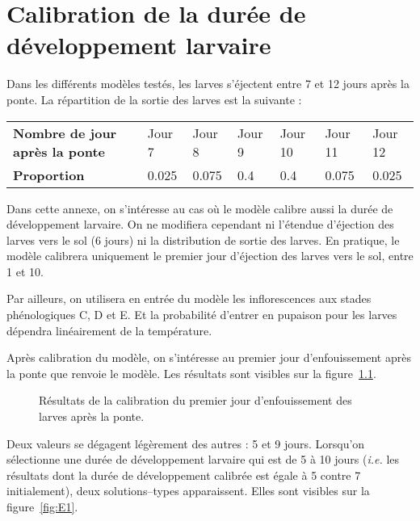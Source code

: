\chapter{Calibration de la durée de développement larvaire} 

Dans les différents modèles testés, les larves s’éjectent entre 7 et 12 jours après la ponte.
La répartition de la sortie des larves est la suivante :
\begin{center}
\small
\begin{tabular}{lllllll}
\textbf{Nombre de jour après la ponte} & Jour 7 & Jour 8 & Jour 9 & Jour 10 & Jour 11 & Jour 12\\
\textbf{Proportion} & 0.025 & 0.075 & 0.4 & 0.4 & 0.075 & 0.025
\end{tabular}
\end{center}

Dans cette annexe, on s'intéresse au cas où le modèle calibre aussi la durée de développement larvaire.
On ne modifiera cependant ni l'étendue d'éjection des larves vers le sol (6 jours) ni la distribution de sortie des larves.
En pratique, le modèle calibrera uniquement le premier jour d'éjection des larves vers le sol, entre 1 et 10.

Par ailleurs, on utilisera en entrée du modèle les inflorescences aux stades phénologiques C, D et E. Et la probabilité  d'entrer en pupaison pour les larves dépendra linéairement de la température.

Après calibration du modèle, on s'intéresse au premier jour d'enfouissement après la ponte que renvoie le modèle. Les résultats sont visibles sur la figure~\ref{fig:duree_dvpmt}.

\begin{figure}
 \centering
 \caption{Résultats de la calibration du premier jour d'enfouissement des larves après la ponte.}
 \label{fig:duree_dvpmt}
\end{figure}

Deux valeurs se dégagent légèrement des autres : 5 et 9 jours.
Lorsqu'on sélectionne une durée de développement larvaire qui est de 5 à 10 jours (\textit{i.e.} les résultats dont la durée de développement calibrée est égale à 5 contre 7 initialement), deux solutions--types apparaissent.
Elles sont visibles sur la figure~\ref{fig:E1}.

